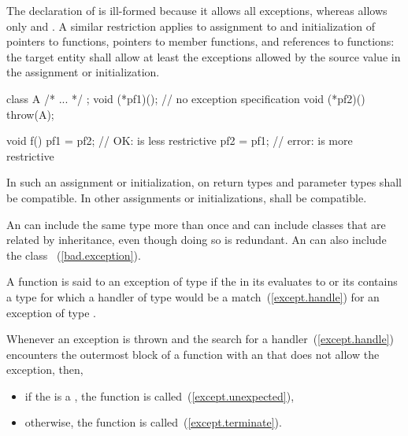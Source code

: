 The declaration of
is ill-formed because it allows all exceptions, whereas
allows only
and
.
\exitexample
A similar restriction applies to assignment to and
initialization of pointers to functions, pointers
to member functions, and references to functions:
the target entity shall allow at least the exceptions
allowed by the source value in the assignment or
initialization.
\enterexample
\begin{codeblock}
class A { /* ... */ };
void (*pf1)();      // no exception specification
void (*pf2)() throw(A);

void f() {
  pf1 = pf2;        // OK:  is less restrictive
  pf2 = pf1;        // error:  is more restrictive
}
\end{codeblock}
\exitexample

\pnum
In such an assignment or initialization,
on return types and parameter types shall be compatible.
In other assignments or initializations,
shall be compatible.

\pnum
An
can include the same type more than once
and can include classes that are related by inheritance,
even though doing so is redundant.
\enternote An
can also include the class
~(\ref{bad.exception}).
\exitnote

\pnum
{}%
%
A function is said to
an exception of type
if
the  in its 
evaluates to  or
its
contains a type
for which a handler of type
would be a match~(\ref{except.handle}) for an exception of type
.

\pnum
{}%
%
Whenever an exception is thrown and the search for a handler~(\ref{except.handle})
encounters the outermost block of a function with an
 that does not allow the exception, then,

\begin{itemize}
\item if the  is a
, the function
 is called~(\ref{except.unexpected}),

%
%
\item otherwise, the function  is called~(\ref{except.terminate}).
\end{itemize}

